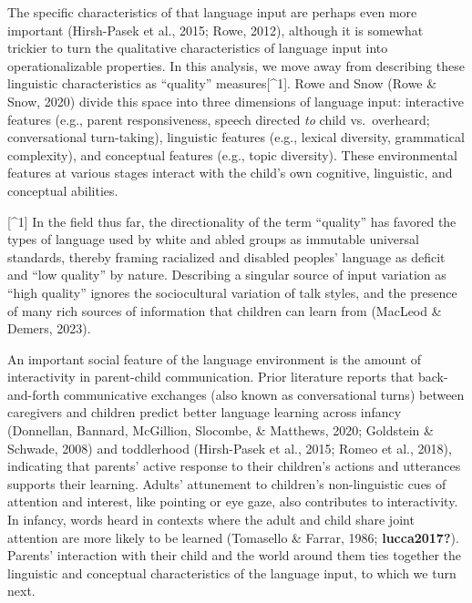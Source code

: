 \documentclass[
  man,floatsintext]{apa6}
\begin{document}
The specific characteristics of that language input are perhaps even more important (Hirsh-Pasek et al., 2015; Rowe, 2012), although it is somewhat trickier to turn the qualitative characteristics of language input into operationalizable properties. In this analysis, we move away from describing these linguistic characteristics as ``quality'' measures{[}\^{}1{]}. Rowe and Snow (Rowe \& Snow, 2020) divide this space into three dimensions of language input: interactive features (e.g., parent responsiveness, speech directed \emph{to} child vs.~overheard; conversational turn-taking), linguistic features (e.g., lexical diversity, grammatical complexity), and conceptual features (e.g., topic diversity). These environmental features at various stages interact with the child's own cognitive, linguistic, and conceptual abilities.

{[}\^{}1{]} In the field thus far, the directionality of the term ``quality'' has favored the types of language used by white and abled groups as immutable universal standards, thereby framing racialized and disabled peoples' language as deficit and ``low quality'' by nature. Describing a singular source of input variation as ``high quality'' ignores the sociocultural variation of talk styles, and the presence of many rich sources of information that children can learn from (MacLeod \& Demers, 2023).

An important social feature of the language environment is the amount of interactivity in parent-child communication. Prior literature reports that back-and-forth communicative exchanges (also known as conversational turns) between caregivers and children predict better language learning across infancy (Donnellan, Bannard, McGillion, Slocombe, \& Matthews, 2020; Goldstein \& Schwade, 2008) and toddlerhood (Hirsh-Pasek et al., 2015; Romeo et al., 2018), indicating that parents' active response to their children's actions and utterances supports their learning. Adults' attunement to children's non-linguistic cues of attention and interest, like pointing or eye gaze, also contributes to interactivity. In infancy, words heard in contexts where the adult and child share joint attention are more likely to be learned (Tomasello \& Farrar, 1986; \textbf{lucca2017?}). Parents' interaction with their child and the world around them ties together the linguistic and conceptual characteristics of the language input, to which we turn next.
\end{document}
